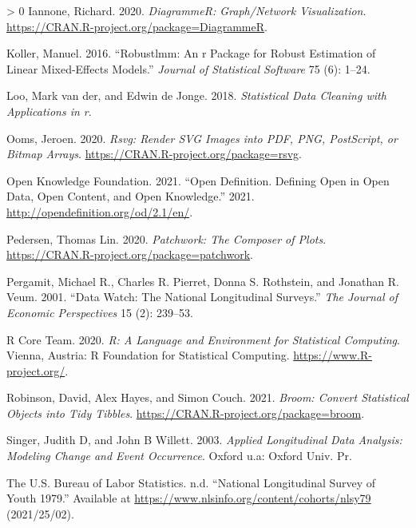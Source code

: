 \documentclass{article}
\newlength{\cslhangindent}
\newenvironment{CSLReferences}[3] %
 {%
  \setlength{\parindent}{0pt}
  \ifodd #1 \everypar{\setlength{\hangindent}{\cslhangindent}}\ignorespaces\fi
  \ifnum #2 > 0
  \setlength{\parskip}{#2\baselineskip}
  \fi
 }%
 {}
\begin{document}
\begin{CSLReferences}{1}{0}
\leavevmode\hypertarget{ref-DiagrammeR}{}%
Iannone, Richard. 2020. \emph{DiagrammeR: Graph/Network Visualization}. \url{https://CRAN.R-project.org/package=DiagrammeR}.

\leavevmode\hypertarget{ref-KollerManuel2016rARP}{}%
Koller, Manuel. 2016. {``Robustlmm: An r Package for Robust Estimation of Linear Mixed-Effects Models.''} \emph{Journal of Statistical Software} 75 (6): 1--24.

\leavevmode\hypertarget{ref-LooMarkvander2018Sdcw}{}%
Loo, Mark van der, and Edwin de Jonge. 2018. \emph{Statistical Data Cleaning with Applications in r}.

\leavevmode\hypertarget{ref-rsvg}{}%
Ooms, Jeroen. 2020. \emph{Rsvg: Render SVG Images into PDF, PNG, PostScript, or Bitmap Arrays}. \url{https://CRAN.R-project.org/package=rsvg}.

\leavevmode\hypertarget{ref-opendata}{}%
Open Knowledge Foundation. 2021. {``Open Definition. Defining Open in Open Data, Open Content, and Open Knowledge.''} 2021. \url{http://opendefinition.org/od/2.1/en/}.

\leavevmode\hypertarget{ref-patchwork}{}%
Pedersen, Thomas Lin. 2020. \emph{Patchwork: The Composer of Plots}. \url{https://CRAN.R-project.org/package=patchwork}.

\leavevmode\hypertarget{ref-MichaelRPergamit2001DWTN}{}%
Pergamit, Michael R., Charles R. Pierret, Donna S. Rothstein, and Jonathan R. Veum. 2001. {``Data Watch: The National Longitudinal Surveys.''} \emph{The Journal of Economic Perspectives} 15 (2): 239--53.

\leavevmode\hypertarget{ref-R}{}%
R Core Team. 2020. \emph{R: A Language and Environment for Statistical Computing}. Vienna, Austria: R Foundation for Statistical Computing. \url{https://www.R-project.org/}.

\leavevmode\hypertarget{ref-broom}{}%
Robinson, David, Alex Hayes, and Simon Couch. 2021. \emph{Broom: Convert Statistical Objects into Tidy Tibbles}. \url{https://CRAN.R-project.org/package=broom}.

\leavevmode\hypertarget{ref-SingerJudithD2003Alda}{}%
Singer, Judith D, and John B Willett. 2003. \emph{Applied Longitudinal Data Analysis: Modeling Change and Event Occurrence}. Oxford u.a: Oxford Univ. Pr.

\leavevmode\hypertarget{ref-nlsy79}{}%
The U.S. Bureau of Labor Statistics. n.d. {``National Longitudinal Survey of Youth 1979.''} Available at \url{https://www.nlsinfo.org/content/cohorts/nlsy79} (2021/25/02).


\end{CSLReferences}
\end{document}
